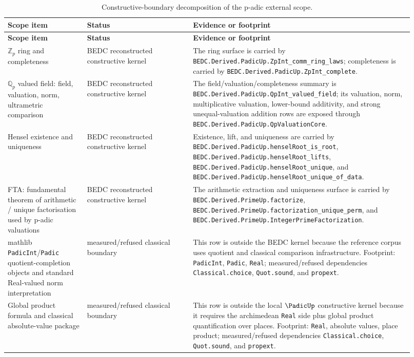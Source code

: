 \begin{longtable}{p{0.18\linewidth}p{0.24\linewidth}p{0.50\linewidth}}
\caption{Constructive-boundary decomposition of the p-adic external scope.}
\label{tab:padic-decomposition}\\
\toprule
\textbf{Scope item} & \textbf{Status} & \textbf{Evidence or footprint}\\
\midrule
\endfirsthead
\toprule
\textbf{Scope item} & \textbf{Status} & \textbf{Evidence or footprint}\\
\midrule
\endhead
$\mathbb{Z}_p$ ring and completeness &
BEDC reconstructed constructive kernel &
The ring surface is carried by
\texttt{BEDC.Derived.PadicUp.ZpInt\_comm\_ring\_laws}; completeness is carried by
\texttt{BEDC.Derived.PadicUp.ZpInt\_complete}.\\
\addlinespace
$\mathbb{Q}_p$ valued field: field, valuation, norm, ultrametric comparison &
BEDC reconstructed constructive kernel &
The field/valuation/completeness summary is
\texttt{BEDC.Derived.PadicUp.QpInt\_valued\_field}; its valuation, norm, multiplicative valuation, lower-bound additivity, and strong unequal-valuation addition rows are exposed through
\texttt{BEDC.Derived.PadicUp.QpValuationCore}.\\
\addlinespace
Hensel existence and uniqueness &
BEDC reconstructed constructive kernel &
Existence, lift, and uniqueness are carried by
\texttt{BEDC.Derived.PadicUp.henselRoot\_is\_root},
\texttt{BEDC.Derived.PadicUp.henselRoot\_lifts},
\texttt{BEDC.Derived.PadicUp.henselRoot\_unique}, and
\texttt{BEDC.Derived.PadicUp.henselRoot\_unique\_of\_data}.\\
\addlinespace
FTA: fundamental theorem of arithmetic / unique factorisation used by p-adic valuations &
BEDC reconstructed constructive kernel &
The arithmetic extraction and uniqueness surface is carried by
\texttt{BEDC.Derived.PrimeUp.factorize},
\texttt{BEDC.Derived.PrimeUp.factorization\_unique\_perm}, and
\texttt{BEDC.Derived.PrimeUp.IntegerPrimeFactorization}.\\
\addlinespace
mathlib \texttt{PadicInt}/\texttt{Padic} quotient-completion objects and standard Real-valued norm interpretation &
measured/refused classical boundary &
This row is outside the BEDC kernel because the reference corpus uses quotient and classical comparison infrastructure. Footprint: \texttt{PadicInt}, \texttt{Padic}, \texttt{Real}; measured/refused dependencies
\texttt{Classical.choice}, \texttt{Quot.sound}, and \texttt{propext}.\\
\addlinespace
Global product formula and classical absolute-value package &
measured/refused classical boundary &
This row is outside the local $\PadicUp$ constructive kernel because it requires the archimedean \texttt{Real} side plus global product quantification over places. Footprint: \texttt{Real}, absolute values, place product; measured/refused dependencies
\texttt{Classical.choice}, \texttt{Quot.sound}, and \texttt{propext}.\\
\bottomrule
\end{longtable}

